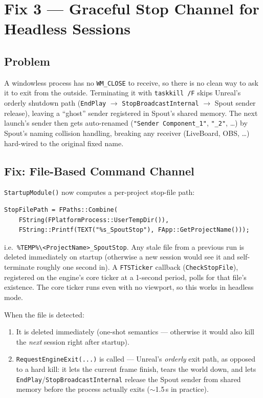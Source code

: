 \documentclass[11pt,a4paper]{article}
\begin{document}
\section{Fix 3 --- Graceful Stop Channel for Headless Sessions}
\label{sec:stop-channel}

\subsection{Problem}
A windowless process has no \texttt{WM\_CLOSE} to receive, so there is no
clean way to ask it to exit from the outside. Terminating it with
\texttt{taskkill /F} skips Unreal's orderly shutdown path
(\texttt{EndPlay} $\rightarrow$ \texttt{StopBroadcastInternal} $\rightarrow$
Spout sender release), leaving a ``ghost'' sender registered in Spout's
shared memory. The next launch's sender then gets auto-renamed
(\texttt{"Sender Component\_1"}, \texttt{"\_2"}, \ldots) by Spout's naming
collision handling, breaking any receiver (LiveBoard, OBS, \ldots) hard-wired
to the original fixed name.

\subsection{Fix: File-Based Command Channel}
\texttt{StartupModule()} now computes a per-project stop-file path:

\begin{lstlisting}[style=cpp]
StopFilePath = FPaths::Combine(
    FString(FPlatformProcess::UserTempDir()),
    FString::Printf(TEXT("%s_SpoutStop"), FApp::GetProjectName()));
\end{lstlisting}

i.e.\ \texttt{\%TEMP\%\textbackslash{}<ProjectName>\_SpoutStop}. Any stale
file from a previous run is deleted immediately on startup (otherwise a new
session would see it and self-terminate roughly one second in). A
\texttt{FTSTicker} callback (\texttt{CheckStopFile}), registered on the
engine's core ticker at a 1-second period, polls for that file's existence.
The core ticker runs even with no viewport, so this works in headless mode.

When the file is detected:
\begin{enumerate}
    \item It is deleted immediately (one-shot semantics --- otherwise it
        would also kill the \emph{next} session right after startup).
    \item \texttt{RequestEngineExit(...)} is called --- Unreal's
        \emph{orderly} exit path, as opposed to a hard kill: it lets the
        current frame finish, tears the world down, and lets
        \texttt{EndPlay}/\texttt{StopBroadcastInternal} release the Spout
        sender from shared memory before the process actually exits
        ($\sim$1.5\,s in practice).
\end{enumerate}
\end{document}
